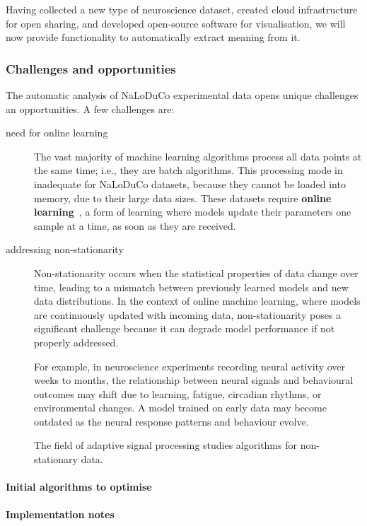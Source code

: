 
Having collected a new type of neuroscience dataset, created cloud
infrastructure for open sharing, and developed open-source software for
visualisation, we will now provide functionality to automatically extract
meaning from it.

\subsubsection*{Challenges and opportunities}

The automatic analysis of NaLoDuCo experimental data opens unique challenges an
opportunities. A few challenges are:

\begin{description}

    \item[need for online learning] The vast majority of machine learning
    algorithms process all data points at the same time; i.e., they are batch
    algorithms. This processing mode in inadequate for NaLoDuCo datasets,
    because they cannot be loaded into memory, due to their large data sizes.
    These datasets require \textbf{online learning}~\citep{shalevShwartz12}, a
    form of learning where models update their parameters one sample at a time,
    as soon as they are received.

    \item[addressing non-stationarity] Non-stationarity occurs when the statistical
    properties of data change over time, leading to a mismatch between
    previously learned models and new data distributions. In the context of
    online machine learning, where models are continuously updated with
    incoming data, non-stationarity poses a significant challenge because it
    can degrade model performance if not properly addressed.

    For example, in neuroscience experiments recording neural activity over
    weeks to months, the relationship between neural signals and behavioural
    outcomes may shift due to learning, fatigue, circadian rhythms, or
    environmental changes. A model trained on early data may become outdated as
    the neural response patterns and behaviour evolve.

    The field of adaptive signal processing\citep{haykin02} studies algorithms for
    non-stationary data.

\end{description}

\paragraph{Initial algorithms to optimise}

\paragraph{Implementation notes}
